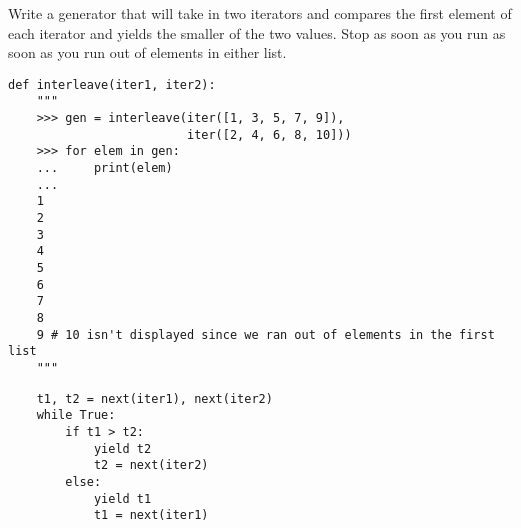 \begin{blocksection}
\question Write a generator that will take in two iterators and compares the
first element of each iterator and yields the smaller of the two values. Stop as soon as you run as soon as you run out of elements in either list. 

\begin{lstlisting}
def interleave(iter1, iter2):
    """
    >>> gen = interleave(iter([1, 3, 5, 7, 9]),
                         iter([2, 4, 6, 8, 10]))
    >>> for elem in gen:
    ...     print(elem)
    ...
    1
    2
    3
    4
    5
    6
    7
    8
    9 # 10 isn't displayed since we ran out of elements in the first list
    """
\end{lstlisting}

\begin{solution}[1in]
\begin{lstlisting}
    t1, t2 = next(iter1), next(iter2)
    while True:
        if t1 > t2:
            yield t2
            t2 = next(iter2)
        else:
            yield t1
            t1 = next(iter1)
\end{lstlisting}
\end{solution}
\end{blocksection}
